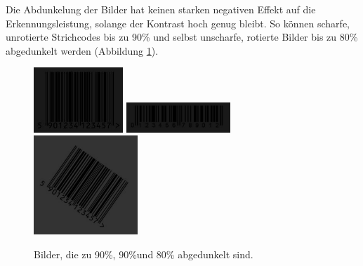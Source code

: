 Die Abdunkelung der Bilder hat keinen starken negativen Effekt auf die Erkennungsleistung, solange der Kontrast hoch genug bleibt. So können scharfe, unrotierte Strichcodes bis zu 90\% und selbst unscharfe, rotierte Bilder bis zu 80\% abgedunkelt werden (Abbildung \ref*{fig:eandark}).

\begin{figure}[H]
  \centering
  \includegraphics[width=0.30\textwidth]{img/EAN13/dark_01_90.jpg}
  \includegraphics[width=0.35\textwidth]{img/EAN13/dark_02_90.jpg}
  \includegraphics[width=0.35\textwidth]{img/EAN13/blurrydarkrotate_01_07_80_35.jpg}
  \caption{Bilder, die zu 90\%, 90\%und 80\% abgedunkelt sind.}
  \label{fig:eandark}
\end{figure}

